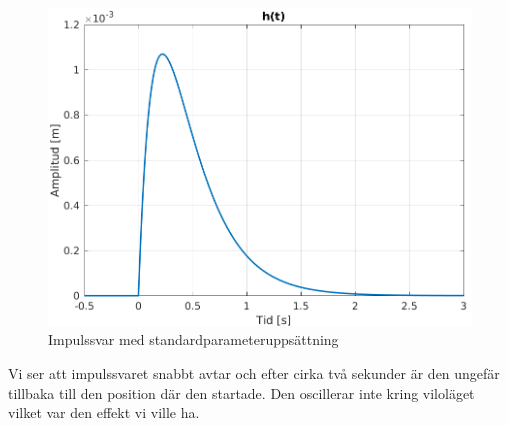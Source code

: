 \begin{figure}[H]
    \centering
    \includegraphics[scale=0.9]{bilder/impulssvar}
    \caption{Impulssvar med standardparameteruppsättning}
    \label{fig:impulssvar}
\end{figure}
Vi ser att impulssvaret snabbt avtar och efter cirka två sekunder är den ungefär tillbaka till den position där den startade. Den oscillerar inte kring viloläget vilket var den effekt vi ville ha.

